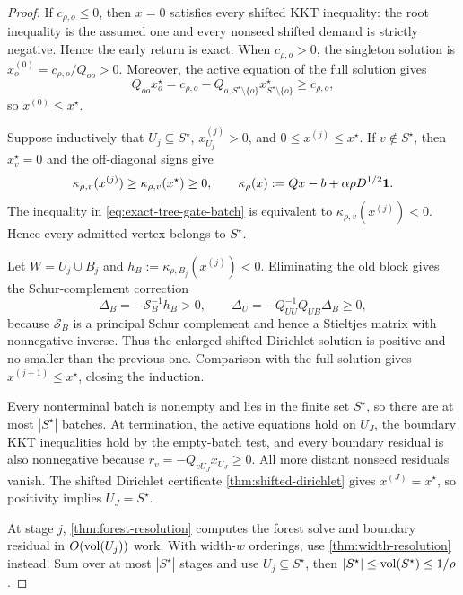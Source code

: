 \begin{proof}
If $c_{\rho,o}\leq0$, then $x=0$ satisfies every shifted KKT inequality:
the root inequality is the assumed one and every nonseed shifted demand is
strictly negative.  Hence the early return is exact.  When
$c_{\rho,o}>0$, the singleton solution is
$x_o^{(0)}=c_{\rho,o}/Q_{oo}>0$.  Moreover, the active equation of the full
solution gives
\[
 Q_{oo}x_o^\star
 =c_{\rho,o}-Q_{o,S^\star\setminus\{o\}}x_{S^\star\setminus\{o\}}^\star
 \geq c_{\rho,o},
\]
so $x^{(0)}\leq x^\star$.

Suppose inductively that $U_j\subseteq S^\star$,
$x^{(j)}_{U_j}>0$, and $0\leq x^{(j)}\leq x^\star$.  If
$v\notin S^\star$, then $x_v^\star=0$ and the
off-diagonal signs give
\begin{equation}
 \kappa_{\rho,v}(x^{(j)})
 \geq\kappa_{\rho,v}(x^\star)\geq0,
 \qquad
 \kappa_\rho(x):=Qx-b+\alpha\rho D^{1/2}\mathbf{1}.
 \label{eq:tree-safe-admission}
\end{equation}
The inequality in \cref{eq:exact-tree-gate-batch} is equivalent to
$\kappa_{\rho,v}(x^{(j)})<0$.  Hence every admitted vertex belongs to
$S^\star$.

Let $W=U_j\cup B_j$ and
$h_B:=\kappa_{\rho,B_j}(x^{(j)})<0$.  Eliminating the old block gives the
Schur-complement correction
\begin{equation}
 \Delta_B=-\mathcal S_B^{-1}h_B>0,
 \qquad
 \Delta_U=-Q_{UU}^{-1}Q_{UB}\Delta_B\geq0,
 \label{eq:tree-positive-expansion}
\end{equation}
because $\mathcal S_B$ is a principal Schur complement and hence a Stieltjes
matrix with nonnegative inverse.  Thus the enlarged shifted Dirichlet solution
is positive and no smaller than the previous one.  Comparison with the full
solution gives $x^{(j+1)}\leq x^\star$, closing the induction.

Every nonterminal batch is nonempty and lies in the finite set $S^\star$, so
there are at most $|S^\star|$ batches.  At termination, the active equations
hold on $U_J$, the boundary KKT inequalities hold by the empty-batch test, and
every boundary residual is also nonnegative because
$r_v=-Q_{vU_J}x_{U_J}\geq0$.  All more distant nonseed residuals vanish.  The
shifted Dirichlet certificate
\cref{thm:shifted-dirichlet} gives $x^{(J)}=x^\star$, so positivity implies
$U_J=S^\star$.

At stage $j$, \cref{thm:forest-resolution} computes the forest solve and
boundary residual in $O(\operatorname{vol}(U_j))$ work.  With width-$w$ orderings, use
\cref{thm:width-resolution} instead.  Sum over at most $|S^\star|$ stages and
use $U_j\subseteq S^\star$, then
$|S^\star|\leq\operatorname{vol}(S^\star)\leq1/\rho$.
\end{proof}

